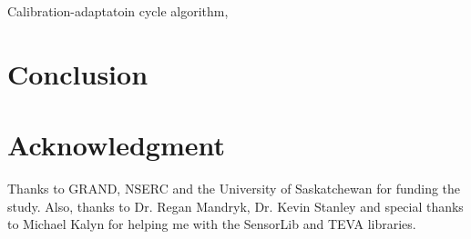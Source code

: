 \documentclass[conference]{IEEEtran}
\begin{document}
Calibration-adaptatoin cycle algorithm, 


\section{Conclusion}
\label{sec:conclusion}


\section*{Acknowledgment}
Thanks to GRAND, NSERC and the University of Saskatchewan for funding the study. Also, thanks to Dr. Regan Mandryk, Dr. Kevin Stanley and special thanks to Michael Kalyn for helping me with the SensorLib and TEVA libraries.



  
\end{document}
